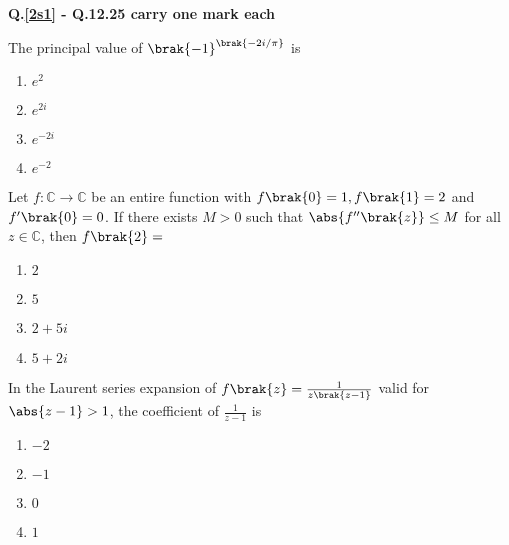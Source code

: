         \item[] \textbf{Q.\ref{2s1} - Q.12.25 carry one mark each}
    \item \label{2s1} The principal value of $\brak{-1} ^ {\brak{-2i / \pi}}$ is
        \begin{enumerate}
            \item $e^{2}$
            \item $e^{2i}$
            \item $e^{-2i}$
            \item $e^{-2}$
        \end{enumerate}

    \item Let $f : \mathbb{C} \rightarrow \mathbb{C}$ be an entire function with $f\brak{0} = 1, f\brak{1} = 2 $ and $f^{\prime} \brak{0} = 0$. If there exists $M > 0$ such that $\abs{f^{\prime \prime} \brak{z}} \leq M$ for all $z \in \mathbb{C}$, then $f\brak{2} = $
        \begin{enumerate}
            \item $2$
            \item $5$
            \item $2+5i$
            \item $5 + 2 i$
        \end{enumerate}

    \item In the Laurent series expansion of $f\brak{z} =  \frac{1}{z\brak{z-1}}$ valid for $\abs{z-1} > 1$, the coefficient of $\frac{1}{z-1}$ is
        \begin{enumerate}
            \item $-2$
            \item $-1$
            \item $0$
            \item $1$
        \end{enumerate}
